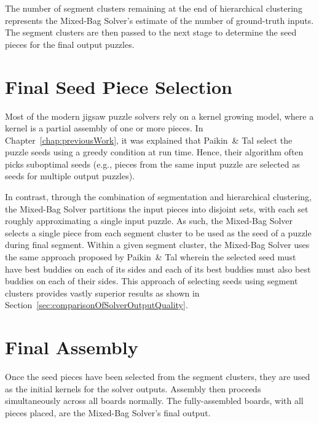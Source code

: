The number of segment clusters remaining at the end of hierarchical clustering represents the Mixed-Bag Solver's estimate of the number of ground-truth inputs.  The segment clusters are then passed to the next stage to determine the seed pieces for the final output puzzles.

\section{Final Seed Piece Selection}\label{sec:finalSeedPiece}

Most of the modern jigsaw puzzle solvers \cite{pomeranz2011, sholomon2013, paikin2015} rely on a kernel growing model, where a kernel is a partial assembly of one or more pieces. In Chapter~\ref{chap:previousWork}, it was explained that Paikin~\& Tal select the puzzle seeds using a greedy condition at run time. Hence, their algorithm often picks suboptimal seeds (e.g., pieces from the same input puzzle are selected as seeds for multiple output puzzles). 

In contrast, through the combination of segmentation and hierarchical clustering, the Mixed-Bag Solver partitions the input pieces into disjoint sets, with each set roughly approximating a single input puzzle.  As such, the Mixed-Bag Solver selects a single piece from each segment cluster to be used as the seed of a puzzle during final segment.  Within a given segment cluster, the Mixed-Bag Solver uses the same approach proposed by Paikin~\& Tal wherein the selected seed must have best buddies on each of its sides and each of its best buddies must also best buddies on each of their sides.  This approach of selecting seeds using segment clusters provides vastly superior results as shown in Section~\ref{sec:comparisonOfSolverOutputQuality}.

\section{Final Assembly}

Once the seed pieces have been selected from the segment clusters, they are used as the initial kernels for the solver outputs.  Assembly then proceeds simultaneously across all boards normally.  The fully-assembled boards, with all pieces placed, are the Mixed-Bag Solver's final output.